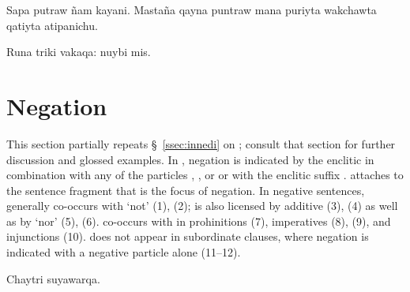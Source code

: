 %
{Sapa putraw \~nam kayani. Masta\~na qayna puntraw mana puriyta wakchawta qatiyta atipanichu.}%
{}%
{}{}%

%
{Runa triki vakaqa: nuybi mis.}%
{}%
{}{}%

\section{Negation}\label{sec:negation}
This section partially repeats \S~\ref{ssec:innedi} on ; consult that section for further discussion and glossed examples. In \SYQ{}, negation is indicated by the enclitic  in combination with any of the particles , , or  or with the enclitic suffix .  attaches to the sentence fragment that is the focus of negation. In negative sentences,  generally co-occurs with  `not' (1), (2);  is also licensed by additive  (3), (4) as well as by  `nor' (5), (6).  co-occurs with  in prohinitions (7), imperatives (8), (9), and injunctions (10).  does not appear in subordinate clauses, where negation is indicated with a negative particle alone (11--12).

%
{Chaytri  suyawarqa.}%
{}%
{}{}%

